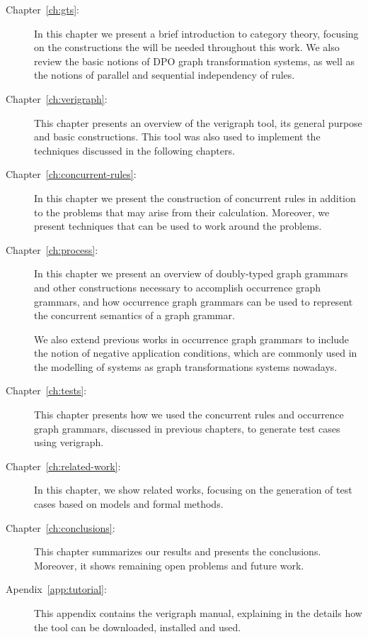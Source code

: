 \begin{description}
  \item[Chapter~\ref{ch:gts}:] In this chapter we present a brief introduction to category theory, focusing on the constructions the will be needed throughout this work.  We also review the basic notions of DPO graph transformation systems, as well as the notions of parallel and sequential independency of rules.
  \item[Chapter~\ref{ch:verigraph}:] This chapter presents an overview of the verigraph tool, its general purpose and basic constructions. This tool was also used to implement the techniques discussed in the following chapters.
  \item[Chapter~\ref{ch:concurrent-rules}:] In this chapter we present the construction of concurrent rules in addition to the problems that may arise from their calculation. Moreover, we present techniques that can be used to work around the problems.
  \item[Chapter~\ref{ch:process}:] In this chapter we present an overview of doubly-typed graph grammars and other constructions necessary to accomplish occurrence graph grammars, and how occurrence graph grammars can be used to represent the concurrent semantics of a graph grammar.

    We also extend previous works in occurrence graph grammars to include the notion of negative application conditions, which are commonly used in the modelling of systems as graph transformations systems nowadays.
  \item[Chapter~\ref{ch:tests}:] This chapter presents how we used the concurrent rules and occurrence graph grammars, discussed in previous chapters, to generate test cases using verigraph.
  \item[Chapter~\ref{ch:related-work}:] In this chapter, we show related works, focusing on the generation of test cases based on models and formal methods.
  \item[Chapter~\ref{ch:conclusions}:] This chapter summarizes our results and presents the conclusions. Moreover, it shows remaining open problems and future work.
  \item[Apendix~\ref{app:tutorial}:] This appendix contains the verigraph manual, explaining in the details how the tool can be downloaded, installed and used.
\end{description}
